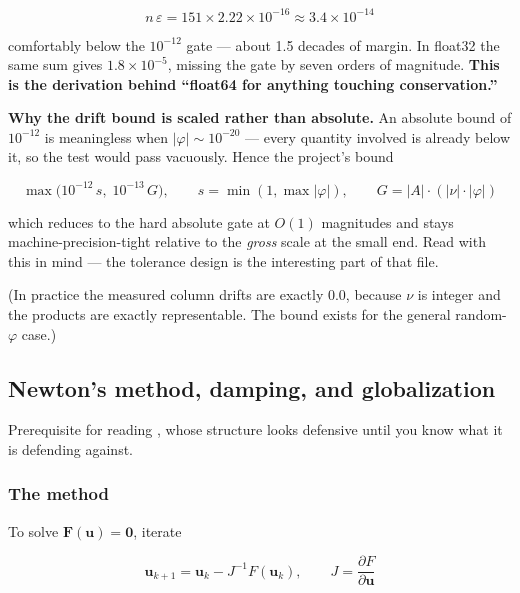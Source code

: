 \begin{equation*}
n\,\varepsilon = 151 \times 2.22\times10^{-16} \approx 3.4\times10^{-14}
\end{equation*}

comfortably below the $10^{-12}$ gate --- about 1.5 decades of margin. In
float32 the same sum gives $1.8\times10^{-5}$, missing the gate by seven orders
of magnitude. \textbf{This is the derivation behind ``float64 for anything
touching conservation.''}

\textbf{Why the drift bound is scaled rather than absolute.} An absolute bound of
$10^{-12}$ is meaningless when $|\varphi| \sim 10^{-20}$ --- every quantity
involved is already below it, so the test would pass vacuously. Hence the
project's bound

\begin{equation*}
\max\!\bigl(10^{-12}\,s,\; 10^{-13}\,G\bigr), \qquad
s = \min(1, \max|\varphi|), \qquad
G = |A|\cdot(|\nu|\cdot|\varphi|)
\end{equation*}

which reduces to the hard absolute gate at $O(1)$ magnitudes and stays
machine-precision-tight relative to the \emph{gross} scale at the small end.
Read  with this in mind --- the tolerance
design is the interesting part of that file.

(In practice the measured column drifts are exactly 0.0, because $\nu$ is
integer and the products are exactly representable. The bound exists for the
general random-$\varphi$ case.)

\subsection{Newton's method, damping, and globalization}
\label{sec:newton}

Prerequisite for reading , whose structure looks defensive
until you know what it is defending against.

\subsubsection{The method}
\label{sec:newtonmethod}

To solve $\mathbf{F}(\mathbf{u}) = \mathbf{0}$, iterate

\begin{equation}
\mathbf{u}_{k+1} = \mathbf{u}_k - J^{-1}F(\mathbf{u}_k), \qquad
J = \frac{\partial F}{\partial \mathbf{u}}
\label{eq:newton}
\end{equation}

